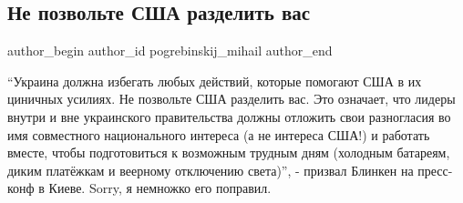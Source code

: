  
 
 
 
 
 
\subsection{Не позвольте США разделить вас}
\label{sec:20_01_2022.fb.pogrebinskij_mihail.1.blinken}
 
\ifcmt
 author_begin
   author_id pogrebinskij_mihail
 author_end
\fi

\enquote{Украина должна избегать любых действий, которые помогают США в их циничных
усилиях. Не позвольте США разделить вас. Это означает, что лидеры внутри и вне
украинского правительства должны отложить свои разногласия во имя совместного
национального интереса (а не интереса США!) и работать вместе, чтобы
подготовиться к возможным трудным дням (холодным батареям, диким платёжкам и
веерному отключению света)}, - призвал Блинкен на пресс-конф в Киеве. Sorry, я
немножко его поправил.
